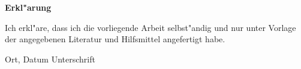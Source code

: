 




\newpage

\textbf{Erkl"arung}

\vspace{10mm}

Ich erkl"are, dass ich die vorliegende Arbeit selbst"andig und nur unter Vorlage der angegebenen Literatur und Hilfsmittel angefertigt habe.

\vspace{30mm}

Ort, Datum \hspace{150pt} Unterschrift

\clearpage
